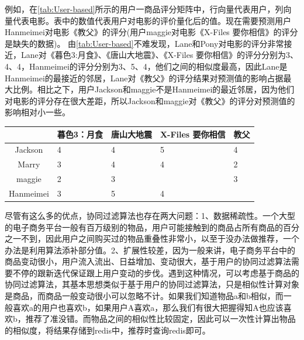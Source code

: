 \begin{enumerate}[(1)]
		例如，在\autoref{tab:User-based}所示的用户一商品评分矩阵中，行向量代表用户，列向量代表电影。表中的数值代表用户对电影的评价量化后的值。现在需要预测用户Hanmeimei对电影《教父》的评分(用户maggie对电影《X-Files 要你相信》的评分是缺失的数据)。
		由\autoref{tab:User-based}不难发现，Lane和Pony对电影的评分非常接近，Lane对《暮色3:月食》、《唐山大地震》、《X-Files 要你相信》的评分分别为3、4、4，Hanmeimei的评分分别为3、5、4，他们之间的相似度最高，因此Lane是Hanmeimei的最接近的邻居，Lane对《教父》的评分结果对预测值的影响占据最大比例。相比之下，用户Jackson和maggie不是Hanmeimei的最近邻居，因为他们对电影的评分存在很大差距，所以Jackson和maggie对《教父》的评分对预测值的影响相对小一些。
		\begin{table}[htp]
		\centering
		\label{tab:User-based}
		\begin{tabular}{ |c|p{2cm}|p{2cm}|p{2cm}|p{2cm}| } \hline
		 & 暮色3：月食 & 唐山大地震 & X-Files 要你相信 & 教父 \\ \hline
		Jackson & 4 & 4 & 5 & 4 \\ \hline
		Marry & 3 & 4 & 4 & 2 \\ \hline
		maggie & 2 & 3 &  & 3 \\ \hline
		Hanmeimei & 3 & 5 & 4 &  \\ \hline
		\end{tabular}
		\end{table}
		\end{enumerate}
		尽管有这么多的优点，协同过滤算法也存在两大问题：1、数据稀疏性。一个大型的电子商务平台一般有百万级别的物品，用户可能接触到的商品占所有商品的百分之一不到，因此用户之间购买过的物品重叠性非常小，以至于没办法做推荐，一个办法是利用算法添补部分值\citep{recmd-slopone}。2、扩展性较差，因为一般来讲，电子商务平台中的商品变动很小，用户流入流出、日益增加、变动很大，基于用户的协同过滤算法需要不停的跟新迭代保证跟上用户变动的步伐。遇到这种情况，可以考虑基于商品的协同过滤算法，其基本思想类似于基于用户的协同过滤算法，只是相似性计算对象是商品，而商品一般变动很小可以忽略不计。如果我们知道物品a和b相似，而一般喜欢a的用户也喜欢b，如果用户A喜欢a，那么我们有很大把握得知A也应该喜欢b，推荐了准没错。而物品之间的相似性比较固定，因此可以一次性计算出物品的相似度，将结果存储到redis中，推荐时查询redis即可。


